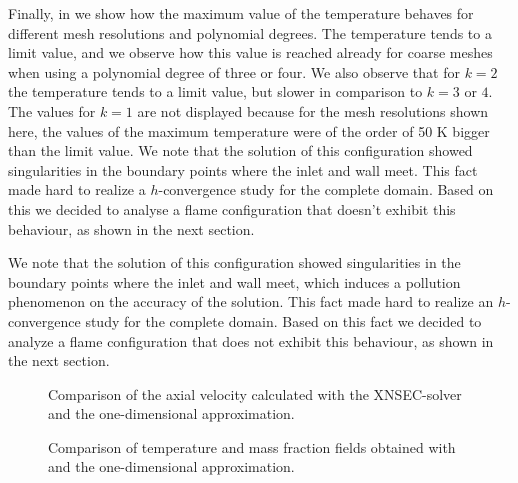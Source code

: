 Finally, in  we show how the maximum value of the temperature behaves for different mesh resolutions and polynomial degrees. The temperature tends to a limit value, and we observe how this value is reached already for coarse meshes when using a polynomial degree of three or four. We also observe that for $k=2$ the temperature tends to a limit value, but slower in comparison to $k =3$ or $4$. The values for $k=1$ are not displayed because for the mesh resolutions shown here, the values of the maximum temperature were of the order of 50 \si{K} bigger than the limit value. We note that the solution of this configuration showed singularities in the boundary points where the inlet and wall meet. This fact made hard to realize a $h$-convergence study for the complete domain. Based on this we decided to analyse a flame configuration that doesn't exhibit this behaviour, as shown in the next section.

We note that the solution of this configuration showed singularities in the boundary points where the inlet and wall meet, which induces a pollution phenomenon on the accuracy of the solution. This fact made hard to realize an $h$-convergence study for the complete domain. Based on this fact we decided to analyze a flame configuration that does not exhibit this behaviour, as shown in the next section.
\begin{figure}[t!]
	\centering
	\caption{Comparison of the axial velocity calculated with the XNSEC-solver and the one-dimensional approximation.}
	\label{fig:BoSSS_1D_Comparison_velocity}
\end{figure}
\newpage
\tikzexternaldisable
\begin{figure}[b!]
	\centering
	\caption{Comparison of temperature and mass fraction fields obtained with \BoSSS and the one-dimensional approximation.}
	\label{fig:BoSSS_1D_Comparison}
\end{figure}
\tikzexternalenable


